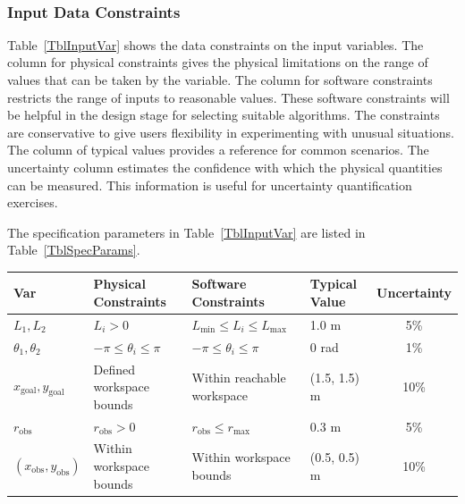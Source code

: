 \documentclass[12pt]{article}
\begin{document}
~\newline



\subsubsection{Input Data Constraints} \label{sec_DataConstraints}    

Table~\ref{TblInputVar} shows the data constraints on the input variables. The column for physical constraints gives the physical limitations on the range of values that can be taken by the variable. The column for software constraints restricts the range of inputs to reasonable values. These software constraints will be helpful in the design stage for selecting suitable algorithms. The constraints are conservative to give users flexibility in experimenting with unusual situations. The column of typical values provides a reference for common scenarios. The uncertainty column estimates the confidence with which the physical quantities can be measured. This information is useful for uncertainty quantification exercises.

The specification parameters in Table~\ref{TblInputVar} are listed in Table~\ref{TblSpecParams}.

\begin{table}[!h]
  \caption{Input Variables for 2D-RAPP} \label{TblInputVar}
  \renewcommand{\arraystretch}{1.2}
\noindent \begin{longtable*}{l l l l c} 
  \toprule
  \textbf{Var} & \textbf{Physical Constraints} & \textbf{Software Constraints} &
                             \textbf{Typical Value} & \textbf{Uncertainty}\\
  \midrule 
  $L_1, L_2$ & $L_i > 0$ & $L_{\text{min}} \leq L_i \leq L_{\text{max}}$ & 1.0 \si[per-mode=symbol] {\metre} & 5\%
  \\
  $\theta_1, \theta_2$ & $-\pi \leq \theta_i \leq \pi$ & $-\pi \leq \theta_i \leq \pi$ & 0 \si[per-mode=symbol]{\radian} & 1\%
  \\
  $x_{\text{goal}}, y_{\text{goal}}$ & Defined workspace bounds & Within reachable workspace & (1.5, 1.5) \si[per-mode=symbol]{\metre} & 10\%
  \\
  $r_{\text{obs}}$ & $r_{\text{obs}} > 0$ & $r_{\text{obs}} \leq r_{\text{max}}$ & 0.3 \si[per-mode=symbol]{\metre} & 5\%
  \\
  $(x_{\text{obs}}, y_{\text{obs}})$ & Within workspace bounds & Within workspace bounds & (0.5, 0.5) \si[per-mode=symbol]{\metre} & 10\%
  \\
  \bottomrule
\end{longtable*}
\end{table}
\end{document}
